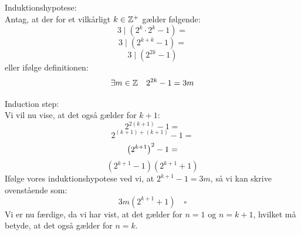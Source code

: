 \documentclass[a4paper,12pt]{article}
\begin{document}
Induktionshypotese:\\
Antag, at der for et vilkårligt $k \in \mathbb{Z}^+$ gælder følgende:\\
\[3 \mid (2^k \cdot 2^k - 1) = \]
\[3 \mid (2^{k+k} - 1) = \]
\[3 \mid (2^{2k} - 1)\]
eller ifølge definitionen:\\
\[\exists m\in \mathbb{Z} \quad 2^{2k} - 1 = 3m\]

Induction step:\\
Vi vil nu vise, at det også gælder for $k+1$:\\
\[2^{2(k+1)} - 1 = \]
\[2^{(k+1)+(k+1)} - 1 = \]
\[\left( 2^{k+1}\right)^2 - 1 = \]
\[(2^{k+1} - 1)(2^{k+1} + 1)\]
Ifølge vores induktionshypotese ved vi, at $2^{k+1} - 1 = 3m$, så vi kan skrive ovenstående som:
\[3m(2^{k+1} + 1) \quad \square\]
Vi er nu færdige, da vi har vist, at det gælder for $n = 1$ og $n = k+1$, hvilket må betyde, at det også gælder for $n = k$.
\end{document}
